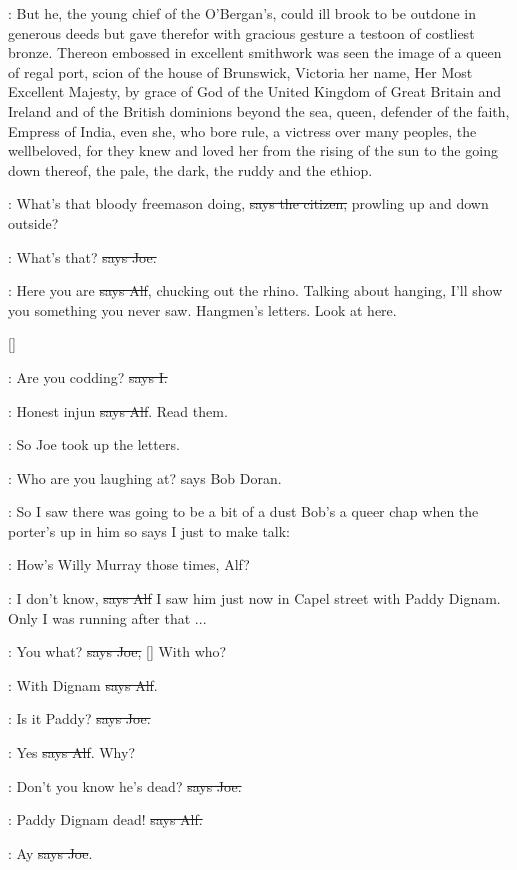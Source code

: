 :
But he, the young chief of the O'Bergan's, could ill brook to be outdone
in generous deeds but gave therefor with gracious gesture a testoon
of costliest bronze. Thereon embossed in excellent smithwork was seen the
image of a queen of regal port, scion of the house of Brunswick, Victoria
her name, Her Most Excellent Majesty, by grace of God of the United
Kingdom of Great Britain and Ireland and of the British dominions beyond
the sea, queen, defender of the faith, Empress of India, even she, who
bore rule, a victress over many peoples, the wellbeloved, for they knew
and loved her from the rising of the sun to the going down thereof, the
pale, the dark, the ruddy and the ethiop.

\citizen:
What's that bloody freemason doing,
\sout{says the citizen,}
prowling up and down outside?

\joe:
What's that? \sout{says Joe.}

\bergan:
Here you are \sout{says Alf}, chucking out the rhino.
Talking about hanging,
I'll show you something you never saw. Hangmen's letters. Look at here.

[]

:
Are you codding? \sout{says I.}

\bergan:
Honest injun \sout{says Alf}. Read them.

\Nq:
So Joe took up the letters.

\doran:
Who are you laughing at? says Bob Doran.

\Nq:
So I saw there was going to be a bit of a dust Bob's a queer chap
when the porter's up in him so says I just to make talk:

:
How's Willy Murray those times, Alf?

\bergan:
I don't know, \sout{says Alf}
I saw him just now in Capel street with Paddy
Dignam. Only I was running after that ...

\joe:
You what?
\sout{says Joe,} []
With who?

\bergan:
With Dignam \sout{says Alf}.

\joe:
Is it Paddy? \sout{says Joe.}

\bergan:
Yes \sout{says Alf}. Why?

\joe:
Don't you know he's dead? \sout{says Joe.}

\bergan:
Paddy Dignam dead! \sout{says Alf.}

\joe:
Ay \sout{says Joe}.


